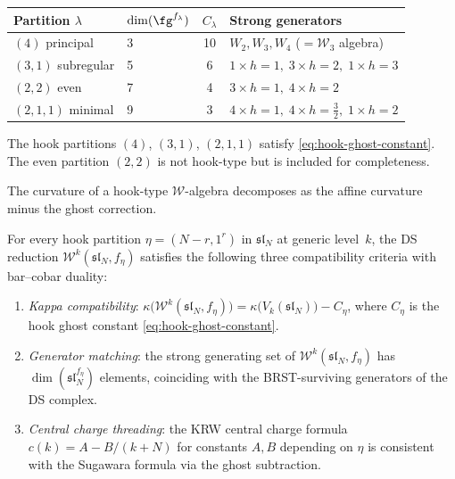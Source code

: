\begin{computation}
\label{comp:sl4-hook-data}
\begin{center}
\begin{tabular}{llcl}
\toprule
Partition $\lambda$ & $\dim(\fg^{f_\lambda})$ & $C_\lambda$
  & Strong generators \\
\midrule
$(4)$ principal & 3 & 10
  & $W_2, W_3, W_4$ ($= \mathcal{W}_3$ algebra) \\
$(3,1)$ subregular & 5 & 6
  & $1 \times h\!=\!1,\; 3 \times h\!=\!2,\; 1 \times h\!=\!3$ \\
$(2,2)$ even & 7 & 4
  & $3 \times h\!=\!1,\; 4 \times h\!=\!2$ \\
$(2,1,1)$ minimal & 9 & 3
  & $4 \times h\!=\!1,\; 4 \times h\!=\!\tfrac32,\; 1 \times h\!=\!2$ \\
\bottomrule
\end{tabular}
\end{center}
The hook partitions $(4)$, $(3,1)$, $(2,1,1)$ satisfy
\eqref{eq:hook-ghost-constant}.  The even partition $(2,2)$ is not
hook-type but is included for completeness.
\end{computation}

The curvature of a hook-type $\mathcal{W}$-algebra decomposes
as the affine curvature minus the ghost correction.

\begin{proposition}
\label{prop:ds-bar-hook-commutation}
For every hook partition $\eta = (N-r, 1^r)$ in
$\mathfrak{sl}_N$ at generic level~$k$, the DS reduction
$\mathcal{W}^k(\mathfrak{sl}_N, f_\eta)$ satisfies the
following three compatibility criteria with bar--cobar duality:
\begin{enumerate}[label=\textup{(\roman*)}]
\item \emph{Kappa compatibility}:
  $\kappa\bigl(\mathcal{W}^k(\mathfrak{sl}_N, f_\eta)\bigr)
  = \kappa\bigl(V_k(\mathfrak{sl}_N)\bigr) - C_\eta$,
  where $C_\eta$ is the hook ghost constant
  \eqref{eq:hook-ghost-constant}.
\item \emph{Generator matching}: the strong generating set of
  $\mathcal{W}^k(\mathfrak{sl}_N, f_\eta)$ has
  $\dim(\mathfrak{sl}_N^{f_\eta})$ elements, coinciding with the
  BRST-surviving generators of the DS complex.
\item \emph{Central charge threading}: the KRW central charge
  formula $c(k) = A - B/(k+N)$ for constants $A, B$ depending on
  $\eta$ is consistent with the Sugawara formula via the ghost
  subtraction.
\end{enumerate}
\end{proposition}

